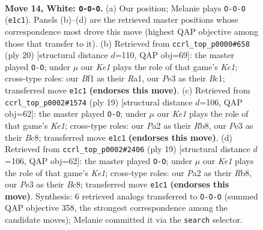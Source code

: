 \documentclass[11pt]{article}
\begin{document}
\clearpage

\begin{figure}[p]\centering
\begin{subfigure}{0.46\textwidth}\centering
\resizebox{\linewidth}{!}{%
\newchessgame
\chessboard[
  setfen={1rbr2k1/p1p1qppp/2n1pn2/2Pp4/1p1P4/1Q2PNP1/PP1B1P1P/R3KB1R w Q - 2 14},
  showmover=false,
  pgfstyle=straightmove, color=movearrow, markmove={e1-c1}
]}
\caption{}
\end{subfigure}\hfill
\begin{subfigure}{0.46\textwidth}\centering
\resizebox{\linewidth}{!}{%
\newchessgame
\chessboard[
  setfen={r1bq1rk1/1p3ppp/2np1n2/p1p1p3/2P5/PPQ1PN1P/3PBPP1/R1B1K2R w KQ - 1 11},
  showmover=false,
  pgfstyle=straightmove, color=movearrow, markmove={e1-g1}
]}
\caption{}
\end{subfigure}
\\[4pt]
\begin{subfigure}{0.46\textwidth}\centering
\resizebox{\linewidth}{!}{%
\newchessgame
\chessboard[
  setfen={1rbqk2r/2p1bppp/p1n1pn2/1p6/2pPP3/2N2NP1/PP2QPBP/R1BR2K1 b k - 1 10},
  showmover=false,
  pgfstyle=straightmove, color=movearrow, markmove={e8-g8}
]}
\caption{}
\end{subfigure}\hfill
\begin{subfigure}{0.46\textwidth}\centering
\resizebox{\linewidth}{!}{%
\newchessgame
\chessboard[
  setfen={1rbqk2r/2p1bppp/p1n1pn2/1p6/2pPP3/2N2NP1/PP2QPBP/R1BR2K1 b k - 1 10},
  showmover=false,
  pgfstyle=straightmove, color=movearrow, markmove={e8-g8}
]}
\caption{}
\end{subfigure}
\caption{\textbf{Move 14, White: \texttt{O-O-O}.} (a) Our position; Melanie plays \texttt{O-O-O} (\texttt{e1c1}). Panels (b)--(d) are the retrieved master positions whose correspondence most drove this move (highest QAP objective among those that transfer to it). (b) Retrieved from \texttt{ccrl\_top\_p0000\#658} (ply 20) [structural distance $d$=110, QAP obj=69]: the master played \texttt{O-O}; under $\mu$ our \emph{Ke1} plays the role of that game's \emph{Ke1}; cross-type roles: our \emph{B}f1 as their \emph{R}a1, our \emph{P}e3 as their \emph{B}c1; transferred move \texttt{e1c1} \textbf{(endorses this move)}. (c) Retrieved from \texttt{ccrl\_top\_p0002\#1574} (ply 19) [structural distance $d$=106, QAP obj=62]: the master played \texttt{O-O}; under $\mu$ our \emph{Ke1} plays the role of that game's \emph{Ke1}; cross-type roles: our \emph{P}a2 as their \emph{R}b8, our \emph{P}e3 as their \emph{B}c8; transferred move \texttt{e1c1} \textbf{(endorses this move)}. (d) Retrieved from \texttt{ccrl\_top\_p0002\#2406} (ply 19) [structural distance $d$=106, QAP obj=62]: the master played \texttt{O-O}; under $\mu$ our \emph{Ke1} plays the role of that game's \emph{Ke1}; cross-type roles: our \emph{P}a2 as their \emph{R}b8, our \emph{P}e3 as their \emph{B}c8; transferred move \texttt{e1c1} \textbf{(endorses this move)}. Synthesis: 6 retrieved analogs transferred to \texttt{O-O-O} (summed QAP objective 358, the strongest correspondence among the candidate moves); Melanie committed it via the \texttt{search} selector.}
\label{fig:thought-m26}
\end{figure}
\end{document}
